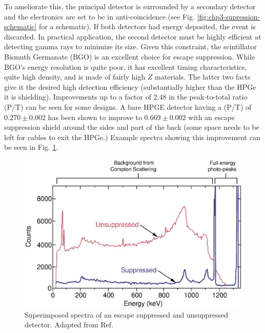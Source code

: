 To ameliorate this, the principal detector is surrounded by a secondary detector and the electronics are set to be in anti-coincidence (see Fig. \ref{fig:chp3-supression-schematic} for a schematic). If both detectors had energy deposited, the event is discarded. In practical application, the second detector must be highly efficient at detecting gamma rays to minimize its size. Given this constraint, the scintillator Bismuth Germanate (BGO) is an excellent choice for escape suppression. While BGO's energy resolution is quite poor, it has excellent timing characteristics, quite high density, and is made of fairly high $Z$ materials. The latter two facts give it the desired high detection efficiency (substantially higher than the HPGe it is shielding). Improvements up to a factor of $2.48$ in the peak-to-total ratio (P/T) can be seen for some designs. A bare HPGE detector having a (P/T) of $0.270\pm0.002$ has been shown to improve to $0.669\pm0.002$\cite{GSComptonSuppression} with an escape suppression shield around the sides and part of the back (some space needs to be left for cables to exit the HPGe.) Example spectra showing this improvement can be seen in Fig. \ref{fig:chp3-supression-improvement}.

\begin{figure}[h!]
	\centerline{\includegraphics[height=0.25\textheight]{./img/c3/suppressed_spectra.eps}}
	\caption{Superimposed spectra of an escape suppressed and unsuppressed detector. Adapted from Ref.\cite{gsBooklet}}
	\label{fig:chp3-supression-improvement}
\end{figure}

